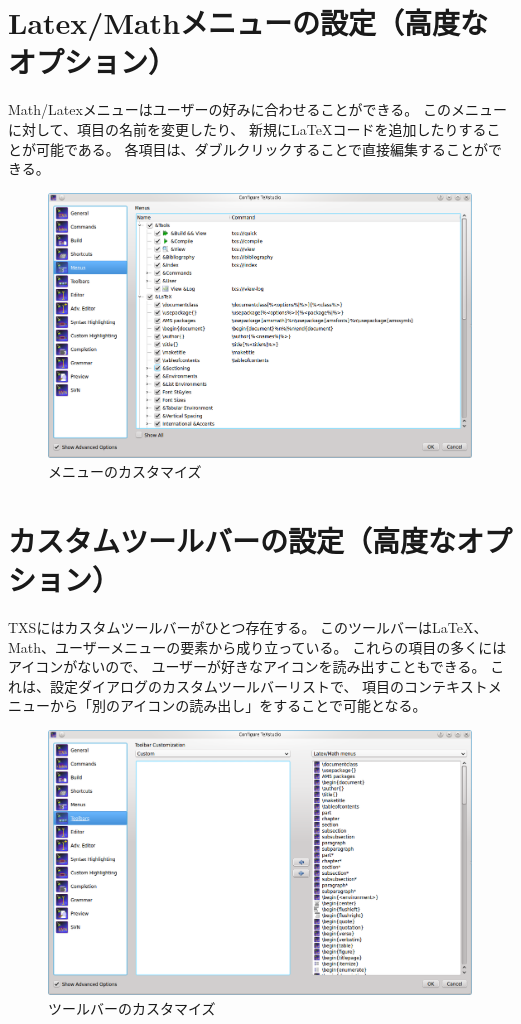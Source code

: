 \section{Latex/Mathメニューの設定（高度なオプション）}

Math/Latexメニューはユーザーの好みに合わせることができる。
このメニューに対して、項目の名前を変更したり、
新規にLaTeXコードを追加したりすることが可能である。
各項目は、ダブルクリックすることで直接編集することができる。

\begin{figure}[H]
  \centering
  \includegraphics[width=.8\linewidth]{configure_customizeMenu.png}
  \caption{メニューのカスタマイズ}
\end{figure}

\section{カスタムツールバーの設定（高度なオプション）}

TXSにはカスタムツールバーがひとつ存在する。
このツールバーはLaTeX、Math、ユーザーメニューの要素から成り立っている。
これらの項目の多くにはアイコンがないので、
ユーザーが好きなアイコンを読み出すこともできる。
これは、設定ダイアログのカスタムツールバーリストで、
項目のコンテキストメニューから「別のアイコンの読み出し」をすることで可能となる。

\begin{figure}[H]
  \centering
  \includegraphics[width=.8\linewidth]{configure_customToolbar.png}
  \caption{ツールバーのカスタマイズ}
\end{figure}


